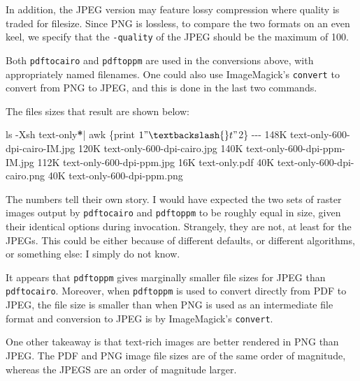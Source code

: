 \documentclass[
  11pt,
  british,
  a4paper,
]{article}
\newenvironment{Shaded}{\begin{snugshade}}{\end{snugshade}}
\newcommand{\AttributeTok}[1]{\textcolor[rgb]{0.80,0.80,0.80}{#1}}
\newcommand{\ExtensionTok}[1]{\textcolor[rgb]{0.80,0.80,0.80}{#1}}
\newcommand{\FunctionTok}[1]{\textcolor[rgb]{0.94,0.94,0.56}{#1}}
\newcommand{\KeywordTok}[1]{\textcolor[rgb]{0.94,0.87,0.69}{#1}}
\newcommand{\NormalTok}[1]{\textcolor[rgb]{0.80,0.80,0.80}{#1}}
\newcommand{\PreprocessorTok}[1]{\textcolor[rgb]{1.00,0.81,0.69}{\textbf{#1}}}
\newcommand{\StringTok}[1]{\textcolor[rgb]{0.80,0.58,0.58}{#1}}
\begin{document}
In addition, the JPEG version may feature lossy compression where
quality is traded for filesize. Since PNG is lossless, to compare the
two formats on an even keel, we specify that the \texttt{-quality} of
the JPEG should be the maximum of 100.

Both \texttt{pdftocairo} and \texttt{pdftoppm} are used in the
conversions above, with appropriately named filenames. One could also
use ImageMagick's \texttt{convert} to convert from PNG to JPEG, and this
is done in the last two commands.

The files sizes that result are shown below:

\begin{Shaded}
\begin{Highlighting}[]
\FunctionTok{ls} \AttributeTok{{-}Xsh}\NormalTok{ text{-}only}\PreprocessorTok{*}\KeywordTok{|} \FunctionTok{awk} \StringTok{\textquotesingle{}\{print $1 "\textbackslash{}t" $2\}\textquotesingle{}}
\ExtensionTok{{-}{-}{-}}
\ExtensionTok{148K}\NormalTok{    text{-}only{-}600{-}dpi{-}cairo{-}IM.jpg}
\ExtensionTok{120K}\NormalTok{    text{-}only{-}600{-}dpi{-}cairo.jpg}
\ExtensionTok{140K}\NormalTok{    text{-}only{-}600{-}dpi{-}ppm{-}IM.jpg}
\ExtensionTok{112K}\NormalTok{    text{-}only{-}600{-}dpi{-}ppm.jpg}
\ExtensionTok{16K}\NormalTok{     text{-}only.pdf}
\ExtensionTok{40K}\NormalTok{     text{-}only{-}600{-}dpi{-}cairo.png}
\ExtensionTok{40K}\NormalTok{     text{-}only{-}600{-}dpi{-}ppm.png}
\end{Highlighting}
\end{Shaded}

The numbers tell their own story. I would have expected the two sets of
raster images output by \texttt{pdftocairo} and \texttt{pdftoppm} to be
roughly equal in size, given their identical options during invocation.
Strangely, they are not, at least for the JPEGs. This could be either
because of different defaults, or different algorithms, or something
else: I simply do not know.

It appears that \texttt{pdftoppm} gives marginally smaller file sizes
for JPEG than \texttt{pdftocairo}. Moreover, when \texttt{pdftoppm} is
used to convert directly from PDF to JPEG, the file size is smaller than
when PNG is used as an intermediate file format and conversion to JPEG
is by ImageMagick's \texttt{convert}.

One other takeaway is that text-rich images are better rendered in PNG
than JPEG. The PDF and PNG image file sizes are of the same order of
magnitude, whereas the JPEGS are an order of magnitude larger.
\end{document}
